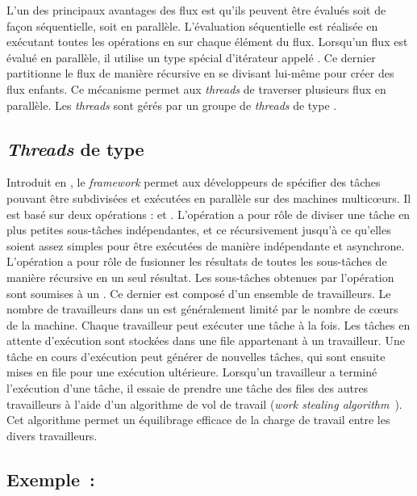 L'un des principaux avantages des flux est qu'ils peuvent \^etre \'evalu\'es soit de fa\c{c}on s\'equentielle, soit en parall\`ele. L'\'evaluation s\'equentielle est r\'ealis\'ee en ex\'ecutant toutes les op\'erations en  sur chaque \'el\'ement du flux. Lorsqu'un flux est \'evalu\'e en parall\`ele, il utilise un type sp\'ecial d'it\'erateur appel\'e . Ce dernier partitionne le flux de mani\`ere r\'ecursive en se divisant lui-m\^eme pour cr\'eer des flux enfants. Ce m\'ecanisme permet aux \emph{threads} de traverser plusieurs flux en parall\`ele. Les \emph{threads} sont g\'er\'es par un groupe de \emph{threads} de type .


\subsection{\emph{Threads} de type }

Introduit en , le \emph{framework}  permet aux d\'eveloppeurs de sp\'ecifier des t\^aches pouvant \^etre subdivis\'ees et ex\'ecut\'ees en parall\`ele sur des machines multicœurs. Il est bas\'e sur deux op\'erations :  et . L'op\'eration  a pour r\^ole de diviser une t\^ache en plus petites sous-t\^aches ind\'ependantes, et ce  r\'ecursivement jusqu'\`a ce qu'elles soient assez simples pour \^etre ex\'ecut\'ees de mani\`ere ind\'ependante et asynchrone. L'op\'eration  a pour r\^ole de fusionner les r\'esultats de toutes les sous-t\^aches de mani\`ere r\'ecursive en un seul r\'esultat.
Les sous-t\^aches obtenues par l'op\'eration  sont soumises \`a un . Ce dernier est composé d'un ensemble de travailleurs. Le nombre de travailleurs dans un  est g\'en\'eralement limit\'e par le nombre de cœurs de la machine. Chaque travailleur peut ex\'ecuter une t\^ache \`a la fois. Les t\^aches en attente d'ex\'ecution sont stock\'ees dans une file appartenant \`a un travailleur. Une t\^ache en cours d'ex\'ecution peut g\'en\'erer de nouvelles t\^aches, qui sont ensuite mises en file  pour une ex\'ecution ult\'erieure. Lorsqu'un travailleur a termin\'e l'ex\'ecution d'une t\^ache, il essaie de prendre une t\^ache des files des autres travailleurs \`a l'aide d'un algorithme de vol de travail (\emph{work stealing algorithm}~\cite{FrigoLeiRan98}). Cet algorithme permet un \'equilibrage efficace de la charge de travail entre les divers travailleurs.


\subsection{Exemple~: }


